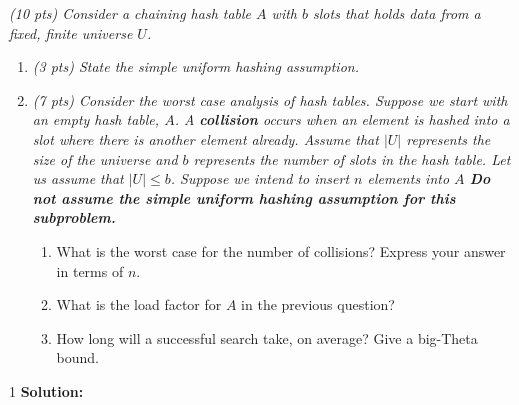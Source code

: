 \documentclass[9pt]{article}
\def\solutions{1}
\begin{document}
\vspace{5mm}
\item { \itshape 
	    (10 pts) Consider a chaining hash table $A$ with $b$ slots that holds data from a fixed, finite universe $U$. }
		\begin{enumerate}
		\item {\itshape (3 pts) State the simple uniform hashing assumption. }
		
		\item {\itshape (7 pts) Consider the worst case analysis of hash tables. Suppose we start with an empty hash table, $A$. A \textbf{collision} occurs when an element is hashed into a slot where there is another element already. Assume that $|U|$ represents the size of the universe and $b$ represents the number of slots in the hash table. Let us assume that $|U|\le b$. Suppose we intend to insert $n$ elements into $A$ \textbf{Do not assume the simple uniform hashing assumption for this subproblem.}
		\begin{enumerate}
	      \item What is the worst case for the number of collisions? Express your answer in terms of $n$.
	      \item What is the load factor for $A$ in the previous question?
	      \item How long will a successful search take, on average? Give a big-Theta bound.
	\end{enumerate}}
		
    \end{enumerate}
	\if\solutions1
\textbf{Solution:} \\
\end{document}
